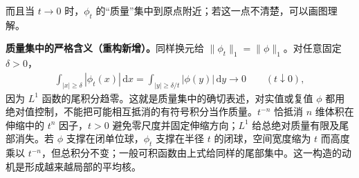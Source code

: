 \documentclass[../../main.tex]{subfiles}
\begin{document}
而且当 $t\to0$ 时，$\phi_t$ 的“质量”集中到原点附近；若这一点不清楚，可以画图理解。
\begin{remark}
\textbf{质量集中的严格含义（重构新增）。}同样换元给 $\|\phi_t\|_1=\|\phi\|_1$。对任意固定 $\delta>0$，
\begin{align*}
\int_{|x|\geqslant\delta}|\phi_t(x)|\,\mathrm dx
=\int_{|y|\geqslant\delta/t}|\phi(y)|\,\mathrm dy\longrightarrow0
\qquad(t\downarrow0),
\end{align*}
因为 $L^1$ 函数的尾积分趋零。这就是质量集中的确切表述，对实值或复值 $\phi$ 都用绝对值控制，不能把可能相互抵消的有符号积分当作质量。$t^{-n}$ 恰抵消 $n$ 维体积在伸缩中的 $t^n$ 因子，$t>0$ 避免零尺度并固定伸缩方向；$L^1$ 给总绝对质量有限及尾部消失。若 $\phi$ 支撑在闭单位球，$\phi_t$ 支撑在半径 $t$ 的闭球，空间宽度缩为 $t$ 而高度乘以 $t^{-n}$，但总积分不变；一般可积函数由上式给同样的尾部集中。这一构造的动机是形成越来越局部的平均核。
\end{remark}

\end{document}
